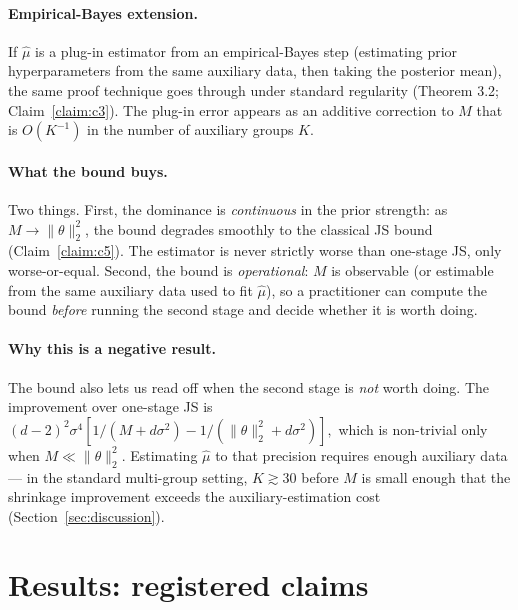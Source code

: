 \documentclass{rrxiv}
\begin{document}
\paragraph{Empirical-Bayes extension.} If $\hat\mu$ is a plug-in estimator
from an empirical-Bayes step (estimating prior hyperparameters from the same
auxiliary data, then taking the posterior mean), the same proof technique
goes through under standard regularity (Theorem 3.2;
Claim~\ref{claim:c3}). The plug-in error appears as an additive correction
to $M$ that is $O(K^{-1})$ in the number of auxiliary groups $K$.

\paragraph{What the bound buys.} Two things. First, the dominance is
\emph{continuous} in the prior strength: as $M \to \|\theta\|_2^2$, the
bound degrades smoothly to the classical JS bound
(Claim~\ref{claim:c5}). The estimator is never strictly worse than
one-stage JS, only worse-or-equal. Second, the bound is \emph{operational}:
$M$ is observable (or estimable from the same auxiliary data used to fit
$\hat\mu$), so a practitioner can compute the bound \emph{before} running
the second stage and decide whether it is worth doing.

\paragraph{Why this is a negative result.} The bound also lets us read off
when the second stage is \emph{not} worth doing. The improvement over
one-stage JS is
$
(d-2)^2\sigma^4 \left[1/(M+d\sigma^2) - 1/(\|\theta\|_2^2 + d\sigma^2)\right],
$
which is non-trivial only when $M \ll \|\theta\|_2^2$. Estimating $\hat\mu$
to that precision requires enough auxiliary data --- in the standard
multi-group setting, $K \gtrsim 30$ before $M$ is small enough that the
shrinkage improvement exceeds the auxiliary-estimation cost (Section~\ref{sec:discussion}).

\section{Results: registered claims}
\label{sec:claims}
\end{document}

